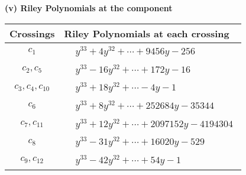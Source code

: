 \documentclass[1p]{elsarticle_modified}
\theoremstyle{definition}
\begin{document}
\flushleft \textbf{(v) Riley Polynomials at the component}\newline \\
\begin{tabular}{m{50pt}|m{274pt}}
Crossings & \hspace{64pt}Riley Polynomials at each crossing \\
\hline $$\begin{aligned}c_{1}\end{aligned}$$&$\begin{aligned}
&y^{33}+4 y^{32}+\cdots+9456 y-256
\end{aligned}$\\
\hline $$\begin{aligned}c_{2},c_{5}\end{aligned}$$&$\begin{aligned}
&y^{33}-16 y^{32}+\cdots+172 y-16
\end{aligned}$\\
\hline $$\begin{aligned}c_{3},c_{4},c_{10}\end{aligned}$$&$\begin{aligned}
&y^{33}+18 y^{32}+\cdots-4 y-1
\end{aligned}$\\
\hline $$\begin{aligned}c_{6}\end{aligned}$$&$\begin{aligned}
&y^{33}+8 y^{32}+\cdots+252684 y-35344
\end{aligned}$\\
\hline $$\begin{aligned}c_{7},c_{11}\end{aligned}$$&$\begin{aligned}
&y^{33}+12 y^{32}+\cdots+2097152 y-4194304
\end{aligned}$\\
\hline $$\begin{aligned}c_{8}\end{aligned}$$&$\begin{aligned}
&y^{33}-31 y^{32}+\cdots+16020 y-529
\end{aligned}$\\
\hline $$\begin{aligned}c_{9},c_{12}\end{aligned}$$&$\begin{aligned}
&y^{33}-42 y^{32}+\cdots+54 y-1
\end{aligned}$\\
\hline
\end{tabular}\\~\\
\end{document}
